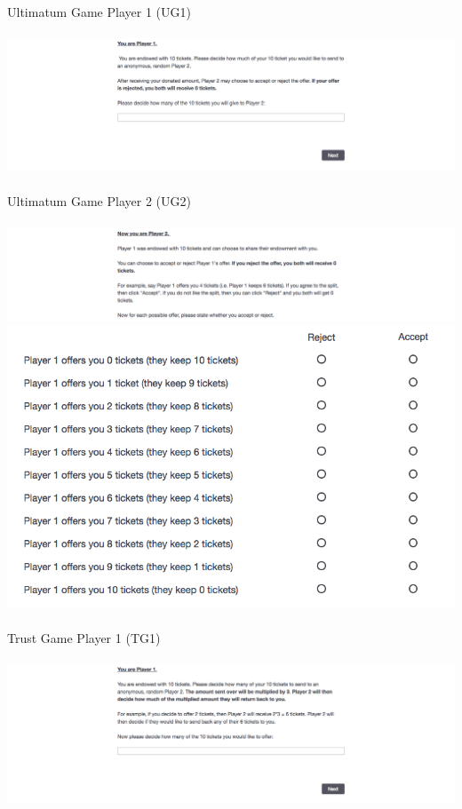 \documentclass[12pt]{article}
\begin{document}
{\noindent Ultimatum Game Player 1 (UG1) \\ \\ 
\includegraphics[scale=0.35]{ultimatum1} \\ \\
\noindent Ultimatum Game Player 2 (UG2) \\ \\
\includegraphics[scale=0.35]{ultimatum2} \\
\includegraphics[scale=0.35]{ultimatum3} \\ \\
\noindent Trust Game Player 1 (TG1) \\ \\
\includegraphics[scale=0.35]{trust1} \\ \\
}
\end{document}
